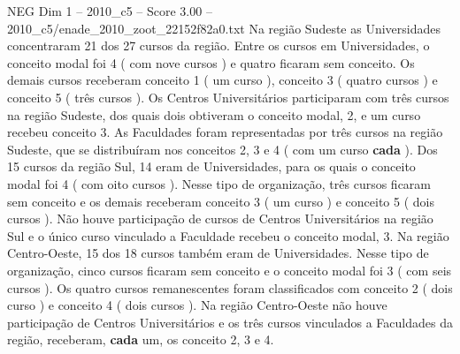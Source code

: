 \begin{textsample}{NEG Dim 1 – 2010\_c5 – Score 3.00 – 2010\_c5/enade\_2010\_zoot\_22152f82a0.txt}
Na região Sudeste as Universidades concentraram 21 dos 27 cursos da região.
Entre os cursos em Universidades, o conceito modal foi 4 ( com nove cursos ) e quatro ficaram sem conceito.
Os demais cursos receberam conceito 1 ( um curso ), conceito 3 ( quatro cursos ) e conceito 5 ( três cursos ).
Os Centros Universitários participaram com três cursos na região Sudeste, dos quais dois obtiveram o conceito modal, 2, e um curso recebeu conceito 3.
As Faculdades foram representadas por três cursos na região Sudeste, que se distribuíram nos conceitos 2, 3 e 4 ( com um curso \textbf{cada} ).
Dos 15 cursos da região Sul, 14 eram de Universidades, para os quais o conceito modal foi 4 ( com oito cursos ).
Nesse tipo de organização, três cursos ficaram sem conceito e os demais receberam conceito 3 ( um curso ) e conceito 5 ( dois cursos ).
Não houve participação de cursos de Centros Universitários na região Sul e o único curso vinculado a Faculdade recebeu o conceito modal, 3.
Na região Centro-Oeste, 15 dos 18 cursos também eram de Universidades.
Nesse tipo de organização, cinco cursos ficaram sem conceito e o conceito modal foi 3 ( com seis cursos ).
Os quatro cursos remanescentes foram classificados com conceito 2 ( dois curso ) e conceito 4 ( dois cursos ).
Na região Centro-Oeste não houve participação de Centros Universitários e os três cursos vinculados a Faculdades da região, receberam, \textbf{cada} um, os conceito 2, 3 e 4.

\end{textsample}
